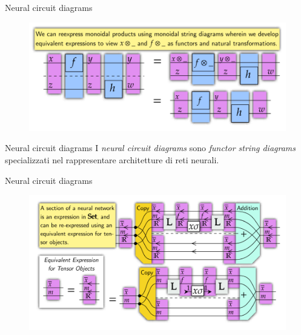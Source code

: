 \documentclass{beamer}
\begin{document}
\begin{frame}{Neural circuit diagrams}
    \begin{figure}
        \begin{center}
            \includegraphics[width=\textwidth]{figures/monoidal_product_diagram.png}
            \caption*{}
        \end{center}
    \end{figure}
\end{frame}

\begin{frame}{Neural circuit diagrams}
    I \textit{neural circuit diagrams} sono \textit{functor string diagrams} specializzati nel rappresentare architetture di reti neurali.
\end{frame}

\begin{frame}{Neural circuit diagrams}
    \begin{figure}
        \begin{center}
            \includegraphics[width=\textwidth]{figures/from_fsd_to_ncd.png}
            \caption*{}
        \end{center}
    \end{figure}
\end{frame}
\end{document}
